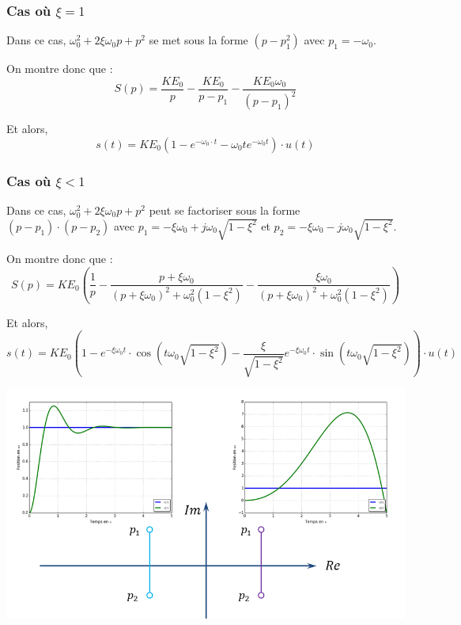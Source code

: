 \documentclass[10pt,fleqn]{article} %
\begin{document}
\subsubsection{Cas où $\xi=1$}
Dans ce cas, $\omega_0^2+2\xi\omega_0 p+ p^2$ se met sous la forme $\left( p-p_1^2\right) $ avec $p_1 = -\omega_0$.

On montre donc que :
$$
S(p)= \dfrac{KE_0}{p} - \dfrac{KE_0}{p-p_1} - \dfrac{KE_0 \omega_0}{\left(p-p_1\right)^2}
$$

Et alors, 
$$
s(t) = KE_0\left(1- e^{-\omega_0 \cdot t} -\omega_0 t  e^{-\omega_0t} \right) \cdot u(t)
$$

\subsubsection{Cas où $\xi<1$}
Dans ce cas, $\omega_0^2+2\xi\omega_0 p+p^2$ peut se factoriser sous la forme $\left(p-p_1\right)\cdot\left(p-p_2\right)$ avec $p_1 = -\xi\omega_0 + j \omega_0 \sqrt{1-\xi^2}$ et $p_2 = -\xi\omega_0 - j \omega_0 \sqrt{1-\xi^2}$.

On montre donc que :
$$
S(p)= KE_0\left( 
\dfrac{1}{p}
-\dfrac{p+\xi\omega_0}{\left( p+\xi\omega_0\right)^2+\omega_0^2\left(1-\xi^2\right)}
-\dfrac{\xi\omega_0}{\left( p+\xi\omega_0\right)^2+\omega_0^2\left(1-\xi^2\right)}
\right)
$$

Et alors, 
$$
s(t) = KE_0\left(1
- e^{-\xi\omega_0 t}\cdot\cos \left(t\omega_0 \sqrt{1-\xi^2} \right)
- \dfrac{\xi}{\sqrt{1-\xi^2}} e^{-\xi\omega_0 t}\cdot\sin \left(t\omega_0 \sqrt{1-\xi^2} \right)
\right) \cdot u(t)
$$


\begin{center}
 \includegraphics[width=.8\textwidth]{images/poles_3}
\end{center}

\end{document}
